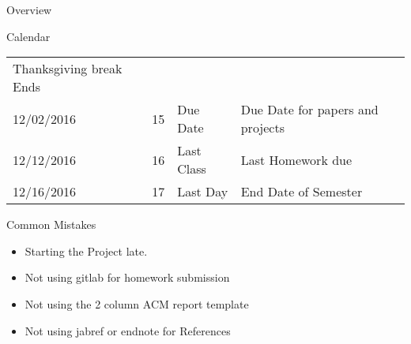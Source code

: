 \begin{edXchapter}{Overview}
\begin{edXsection}{Calendar}
\begin{longtable}[c]{@{}llll@{}}
\begin{minipage}[t]{0.45\columnwidth}\raggedright\strut
Thanksgiving break Ends
\strut\end{minipage}\tabularnewline
\begin{minipage}[t]{0.16\columnwidth}\raggedright\strut
12/02/2016
\strut\end{minipage} &
\begin{minipage}[t]{0.10\columnwidth}\raggedright\strut
15
\strut\end{minipage} &
\begin{minipage}[t]{0.16\columnwidth}\raggedright\strut
Due Date
\strut\end{minipage} &
\begin{minipage}[t]{0.45\columnwidth}\raggedright\strut
Due Date for papers and projects
\strut\end{minipage}\tabularnewline
\begin{minipage}[t]{0.16\columnwidth}\raggedright\strut
12/12/2016
\strut\end{minipage} &
\begin{minipage}[t]{0.10\columnwidth}\raggedright\strut
16
\strut\end{minipage} &
\begin{minipage}[t]{0.16\columnwidth}\raggedright\strut
Last Class
\strut\end{minipage} &
\begin{minipage}[t]{0.45\columnwidth}\raggedright\strut
Last Homework due
\strut\end{minipage}\tabularnewline
\begin{minipage}[t]{0.16\columnwidth}\raggedright\strut
12/16/2016
\strut\end{minipage} &
\begin{minipage}[t]{0.10\columnwidth}\raggedright\strut
17
\strut\end{minipage} &
\begin{minipage}[t]{0.16\columnwidth}\raggedright\strut
Last Day
\strut\end{minipage} &
\begin{minipage}[t]{0.45\columnwidth}\raggedright\strut
End Date of Semester
\strut\end{minipage}\tabularnewline
\bottomrule
\end{longtable}

\end{edXsection}
\begin{edXsection}{Common Mistakes}\label{common-mistakes}

\begin{itemize}
\itemsep1pt\parskip0pt
\item
  Starting the Project late.
\item
  Not using gitlab for homework submission
\item
  Not using the 2 column ACM report template
\item
  Not using jabref or endnote for References
\end{itemize}


\end{edXsection}
\end{edXchapter}
